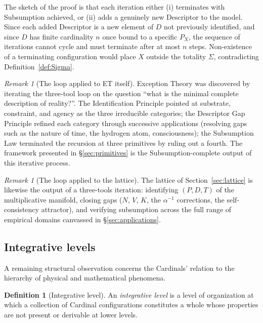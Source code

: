 \documentclass[11pt,a4paper]{article}
\theoremstyle{definition}
\newtheorem{definition}[theorem]{Definition}
\theoremstyle{remark}
\newtheorem{remark}[theorem]{Remark}
\begin{document}
The sketch of the proof is that each iteration either (i) terminates with Subsumption achieved, or (ii) adds a genuinely new Descriptor to the model. Since each added Descriptor is a new element of $D$ not previously identified, and since $D$ has finite cardinality $n$ once bound to a specific $P_{X}$, the sequence of iterations cannot cycle and must terminate after at most $n$ steps. Non-existence of a terminating configuration would place $X$ outside the totality $\Sigma$, contradicting Definition~\ref{def:Sigma}.

\begin{remark}[The loop applied to ET itself]
Exception Theory was discovered by iterating the three-tool loop on the question ``what is the minimal complete description of reality?''. The Identification Principle pointed at substrate, constraint, and agency as the three irreducible categories; the Descriptor Gap Principle refined each category through successive applications (resolving gaps such as the nature of time, the hydrogen atom, consciousness); the Subsumption Law terminated the recursion at three primitives by ruling out a fourth. The framework presented in \S\ref{sec:primitives} is the Subsumption-complete output of this iterative process.
\end{remark}

\begin{remark}[The loop applied to the lattice]
The lattice of Section~\ref{sec:lattice} is likewise the output of a three-tools iteration: identifying $(P,D,T)$ of the multiplicative manifold, closing gaps ($N$, $V$, $K$, the $\alpha^{-1}$ corrections, the self-consistency attractor), and verifying subsumption across the full range of empirical domains canvassed in \S\ref{sec:applications}.
\end{remark}

\subsection{Integrative levels}\label{subsec:levels}

A remaining structural observation concerns the Cardinals' relation to the hierarchy of physical and mathematical phenomena.

\begin{definition}[Integrative level]\label{def:levels}
An \emph{integrative level} is a level of organization at which a collection of Cardinal configurations constitutes a whole whose properties are not present or derivable at lower levels.
\end{definition}
\end{document}
